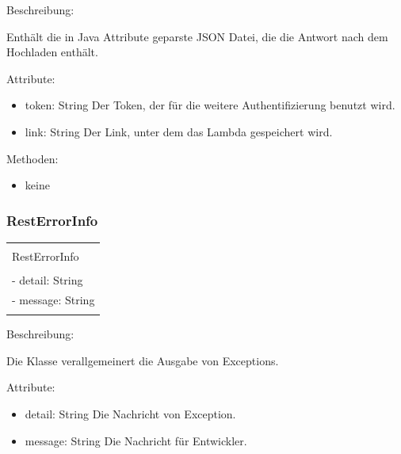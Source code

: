 \documentclass[a4paper,20pt,oneside]{book}
\begin{document}
	\vspace{0.5cm}
	\raggedright
	
	Beschreibung:
		
	Enthält die in Java Attribute geparste JSON Datei, die die Antwort nach dem Hochladen enthält.
	\vspace{0.5cm}
	
	Attribute:
	\begin{itemize}
	\item token: String\linebreak
	Der Token, der für die weitere Authentifizierung benutzt wird.	
	\item link: String\linebreak
	Der Link, unter dem das Lambda gespeichert wird.	
	\end{itemize}
	
	Methoden:
	\begin{itemize}
	\item keine
	\end{itemize}
	
	
	
	\subsubsection{RestErrorInfo}
    \centering
	\begin{tabular}{|l|}
	\hline \\
	RestErrorInfo\\
	\hline \\
	- detail: String\\
	- message: String\\
    \hline \\
	\hline 
	\end{tabular}
	
	\vspace{0.5cm}
	\raggedright
	
	
	Beschreibung:
	
	Die Klasse verallgemeinert die Ausgabe von Exceptions.	
	
	\vspace{0.5cm}
	
	Attribute:
	\begin{itemize}
	\item detail: String\linebreak
	Die Nachricht von Exception.
	\item message: String\linebreak	
	Die Nachricht für Entwickler.
	\end{itemize}
	
\end{document}
